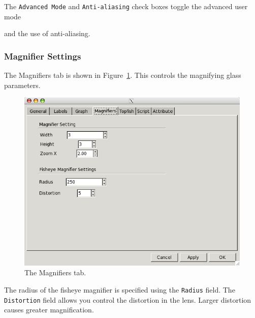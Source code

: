The {\tt Advanced Mode} and {\tt Anti-aliasing} check boxes toggle the advanced user mode 

and the use of anti-aliasing.


\subsubsection{Magnifier Settings}
The Magnifiers tab is shown in Figure~\ref{fig:magnifier}.
This controls the magnifying glass parameters.
\begin{figure}[ht]
\begin{center}
\includegraphics[scale=.5]{figures/magnifier.png}
\caption{\small The Magnifiers tab.}
\label{fig:magnifier}
\end{center}
\end{figure}
The radius of the fisheye magnifier is specified using the {\tt Radius} field.
The {\tt Distortion} field allows you control the distortion in the lens. Larger distortion
causes greater magnification.

